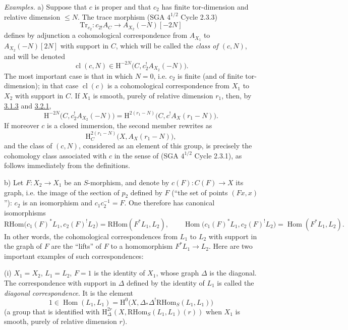 \documentclass[11pt]{article}
\renewcommand{\H}{\mathrm{H}}
\DeclareMathOperator{\Hom}{Hom}
\providecommand{\RHom}{\mathrm{RHom}}
\providecommand{\RHom}{\mathrm{RHom}}
\providecommand{\Hom}{\operatorname{Hom}}
\providecommand{\RHom}{\mathrm R\mathcal{H}om}
\providecommand{\RHom}{\mathrm{RHom}}
\providecommand{\Hom}{\operatorname{Hom}}
\begin{document}
\emph{Examples.} a) Suppose that $c$ is proper and that $c_2$ has finite tor-dimension and relative dimension $\leq N$. The trace morphism (SGA $4^{1/2}$ Cycle 2.3.3)
\[
\mathrm{Tr}_{c_2}:c_{2!}A_C\longrightarrow A_{X_2}(-N)[-2N]
\]
defines by adjunction a cohomological correspondence from $A_{X_1}$ to $A_{X_2}(-N)[2N]$ with support in $C$, which will be called the \emph{class of $(c,N)$}, and will be denoted
\begin{equation}
\operatorname{cl}(c,N)\in \H^{-2N}\bigl(C,c_2^!A_{X_2}(-N)\bigr).
\tag{3.2.4}\label{sga5:III:equation:3.2.4}
\end{equation}
The most important case is that in which $N=0$, i.e. $c_2$ is finite (and of finite tor-dimension); in that case $\operatorname{cl}(c)$ is a cohomological correspondence from $X_1$ to $X_2$ with support in $C$. If $X_1$ is smooth, purely of relative dimension $r_1$, then, by \hyperref[sga5:III:equation:3.1.3]{3.1.3} and \hyperref[sga5:III:equation:3.2.1]{3.2.1},
\begin{equation}
\H^{-2N}\bigl(C,c_2^!A_{X_2}(-N)\bigr)
=
\H^{2(r_1-N)}\bigl(C,c^!A_X(r_1-N)\bigr).
\tag{3.2.5}\label{sga5:III:equation:3.2.5}
\end{equation}
If moreover $c$ is a closed immersion, the second member rewrites as
\[
\H^{2(r_1-N)}_C\bigl(X,A_X(r_1-N)\bigr),
\]
and the class of $(c,N)$, considered as an element of this group, is precisely the cohomology class associated with $c$ in the sense of (SGA $4^{1/2}$ Cycle 2.3.1), as follows immediately from the definitions.

b) Let $F:X_2\to X_1$ be an $S$-morphism, and denote by $c(F):C(F)\to X$ its graph, i.e. the image of the section of $p_2$ defined by $F$ (``the set of points $(Fx,x)$''): $c_2$ is an isomorphism and $c_1c_2^{-1}=F$. One therefore has canonical isomorphisms
\begin{equation}
\RHom\bigl(c_1(F)^*L_1,c_2(F)^!L_2\bigr)=\RHom(F^*L_1,L_2),
\qquad
\Hom\bigl(c_1(F)^*L_1,c_2(F)^!L_2\bigr)=\Hom(F^*L_1,L_2).
\tag{3.2.6}\label{sga5:III:equation:3.2.6}
\end{equation}
In other words, the cohomological correspondences from $L_1$ to $L_2$ with support in the graph of $F$ are the ``lifts'' of $F$ to a homomorphism $F^*L_1\to L_2$. Here are two important examples of such correspondences:

(i) $X_1=X_2$, $L_1=L_2$, $F=1$ is the identity of $X_1$, whose graph $\Delta$ is the diagonal. The correspondence with support in $\Delta$ defined by the identity of $L_1$ is called the \emph{diagonal correspondence}. It is the element
\[
1\in \Hom(L_1,L_1)=\H^0\bigl(X,\Delta_*\Delta^!\RHom_S(L_1,L_1)\bigr)
\]
(a group that is identified with $\H^{2r}_\Delta(X,\RHom_S(L_1,L_1)(r))$ when $X_1$ is smooth, purely of relative dimension $r$).
\end{document}
